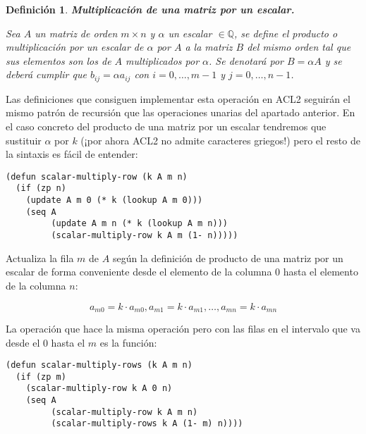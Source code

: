 \documentclass[a4paper,10pt]{article}
\newtheorem{defi}{{Definición}}
\begin{document}
\begin{defi} \textbf{Multiplicación de una matriz por un escalar.}\vspace{8pt}\par
Sea $A$ un matriz de orden $m \times n$ y $\alpha$ un escalar $\in \mathbb{Q}$, se define el producto o \emph{multiplicación por un escalar} de $\alpha$ por $A$ a la matriz $B$ del mismo orden tal que sus elementos son los de $A$ multiplicados por $\alpha$. Se denotará por $B = \alpha A$ y se deberá cumplir que $b_{ij} = \alpha a_{ij}$ con $i = 0,\dots,m-1$ y $j = 0,\dots,n-1$.
\end{defi}

\par \vspace{10pt}

Las definiciones que consiguen implementar esta operación en ACL2 seguirán el mismo patrón de recursión que las operaciones unarias del apartado anterior. En el caso concreto del producto de una matriz por un escalar tendremos que sustituir $\alpha$ por $k$ (¡por ahora ACL2 no admite caracteres griegos!) pero el resto de la sintaxis es fácil de entender:

\par \vspace{10pt}

\begin{lstlisting}[language=clips]
(defun scalar-multiply-row (k A m n)
  (if (zp n)
    (update A m 0 (* k (lookup A m 0)))
    (seq A
         (update A m n (* k (lookup A m n)))
         (scalar-multiply-row k A m (1- n)))))
\end{lstlisting}

\par \vspace{10pt}

Actualiza la fila $m$ de $A$ según la definición de producto de una matriz por un escalar de forma conveniente desde el elemento de la columna 0 hasta el elemento de la columna $n$:

$$
a_{m0} = k\cdot a_{m0},a_{m1} = k\cdot a_{m1},\dots,a_{mn} = k\cdot a_{mn}
$$

\par \vspace{10pt}

La operación que hace la misma operación pero con las filas en el intervalo que va desde el 0 hasta el $m$ es la función:

\begin{lstlisting}[language=clips]
(defun scalar-multiply-rows (k A m n)
  (if (zp m)
    (scalar-multiply-row k A 0 n)
    (seq A
         (scalar-multiply-row k A m n)
         (scalar-multiply-rows k A (1- m) n))))
\end{lstlisting}
\end{document}
